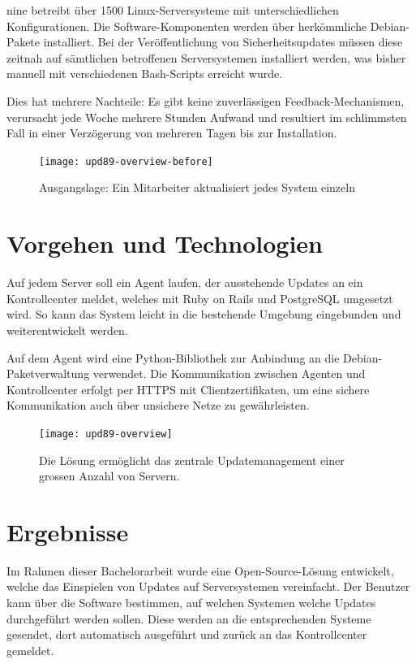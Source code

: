 \gls{nine} betreibt über 1500 Linux-Serversysteme mit unterschiedlichen Konfigurationen. Die Software-Komponenten werden über herkömmliche Debian-Pakete installiert. Bei der Veröffentlichung von Sicherheitsupdates müssen diese zeitnah auf sämtlichen betroffenen Serversystemen installiert werden, was bisher manuell mit verschiedenen Bash-Scripts erreicht wurde.

Dies hat mehrere Nachteile: Es gibt keine zuverlässigen Feedback-Mechanismen, verursacht jede Woche mehrere Stunden Aufwand und resultiert im schlimmsten Fall in einer Verzögerung von mehreren Tagen bis zur Installation.

\begin{figure}
  \centering
    \texttt{[image: upd89-overview-before]}
  \caption{Ausgangslage: Ein Mitarbeiter aktualisiert jedes System einzeln}
  \label{fig:overview-before}
\end{figure}

\section*{Vorgehen und Technologien}

Auf jedem Server soll ein Agent laufen, der ausstehende Updates an ein Kontrollcenter meldet, welches mit Ruby on Rails und PostgreSQL umgesetzt wird. So kann das System leicht in die bestehende Umgebung eingebunden und weiterentwickelt werden. 

Auf dem Agent wird eine Python-Bibliothek zur Anbindung an die Debian-Paketverwaltung verwendet. Die Kommunikation zwischen Agenten und Kontrollcenter erfolgt per HTTPS mit Clientzertifikaten, um eine sichere Kommunikation auch über unsichere Netze zu gewährleisten.

\begin{figure}
  \centering
    \texttt{[image: upd89-overview]}
  \caption{Die Lösung ermöglicht das zentrale Updatemanagement einer grossen Anzahl von Servern.}
  \label{fig:overview}
\end{figure}

\section*{Ergebnisse}   

Im Rahmen dieser Bachelorarbeit wurde eine Open-Source-Lösung entwickelt, welche das Einspielen von Updates auf Serversystemen vereinfacht. Der Benutzer kann über die Software bestimmen, auf welchen Systemen welche Updates durchgeführt werden sollen. Diese werden an die entsprechenden Systeme gesendet, dort automatisch ausgeführt und zurück an das Kontrollcenter gemeldet.


